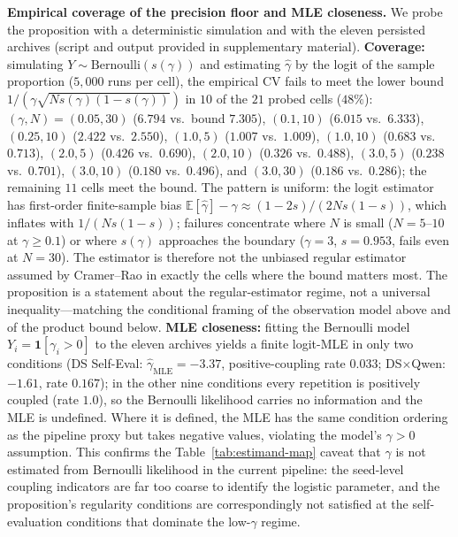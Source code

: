 \documentclass[11pt]{article}
\begin{document}
\noindent\textbf{Empirical coverage of the precision floor and MLE closeness.} We probe the proposition with a deterministic simulation and with the eleven persisted archives (script and output provided in supplementary material). \textbf{Coverage:} simulating $Y\sim\mathrm{Bernoulli}(s(\gamma))$ and estimating $\hat\gamma$ by the logit of the sample proportion ($5{,}000$ runs per cell), the empirical $\mathrm{CV}$ fails to meet the lower bound $1/(\gamma\sqrt{N s(\gamma)(1-s(\gamma))})$ in $10$ of the $21$ probed cells ($48\%$): $(\gamma,N)=(0.05,30)$ ($6.794$ vs.\ bound $7.305$), $(0.1,10)$ ($6.015$ vs.\ $6.333$), $(0.25,10)$ ($2.422$ vs.\ $2.550$), $(1.0,5)$ ($1.007$ vs.\ $1.009$), $(1.0,10)$ ($0.683$ vs.\ $0.713$), $(2.0,5)$ ($0.426$ vs.\ $0.690$), $(2.0,10)$ ($0.326$ vs.\ $0.488$), $(3.0,5)$ ($0.238$ vs.\ $0.701$), $(3.0,10)$ ($0.180$ vs.\ $0.496$), and $(3.0,30)$ ($0.186$ vs.\ $0.286$); the remaining $11$ cells meet the bound. The pattern is uniform: the logit estimator has first-order finite-sample bias $\mathbb{E}[\hat\gamma]-\gamma\approx(1-2s)/(2N s(1-s))$, which inflates with $1/(N s(1-s))$; failures concentrate where $N$ is small ($N{=}5$--$10$ at $\gamma\geq0.1$) or where $s(\gamma)$ approaches the boundary ($\gamma{=}3$, $s{=}0.953$, fails even at $N{=}30$). The estimator is therefore not the unbiased regular estimator assumed by Cramer--Rao in exactly the cells where the bound matters most. The proposition is a statement about the regular-estimator regime, not a universal inequality---matching the conditional framing of the observation model above and of the product bound below. \textbf{MLE closeness:} fitting the Bernoulli model $Y_i=\mathbf{1}[\gamma_i>0]$ to the eleven archives yields a finite logit-MLE in only two conditions (DS Self-Eval: $\hat\gamma_{\mathrm{MLE}}{=}-3.37$, positive-coupling rate $0.033$; DS$\times$Qwen: $-1.61$, rate $0.167$); in the other nine conditions every repetition is positively coupled (rate $1.0$), so the Bernoulli likelihood carries no information and the MLE is undefined. Where it is defined, the MLE has the same condition ordering as the pipeline proxy but takes negative values, violating the model's $\gamma>0$ assumption. This confirms the Table~\ref{tab:estimand-map} caveat that $\gamma$ is not estimated from Bernoulli likelihood in the current pipeline: the seed-level coupling indicators are far too coarse to identify the logistic parameter, and the proposition's regularity conditions are correspondingly not satisfied at the self-evaluation conditions that dominate the low-$\gamma$ regime.
\end{document}
